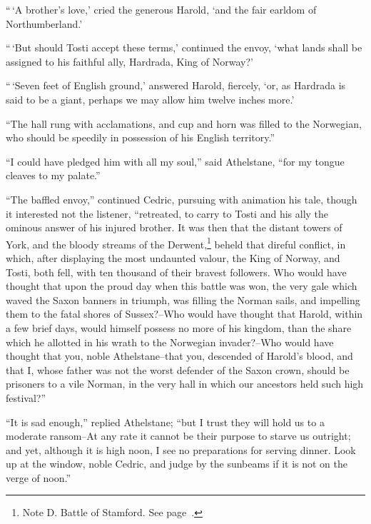 ``\,`A brother's love,' cried the generous Harold, `and the fair earldom
of Northumberland.'

``\,`But should Tosti accept these terms,' continued the envoy, `what
lands shall be assigned to his faithful ally, Hardrada, King of Norway?'

``\,`Seven feet of English ground,' answered Harold, fiercely, `or, as
Hardrada is said to be a giant, perhaps we may allow him twelve inches
more.'

``The hall rung with acclamations, and cup and horn was filled to the
Norwegian, who should be speedily in possession of his English
territory.''

``I could have pledged him with all my soul,'' said Athelstane, ``for my
tongue cleaves to my palate.''

``The baffled envoy,'' continued Cedric, pursuing with animation his
tale, though it interested not the listener, ``retreated, to carry to
Tosti and his ally the ominous answer of his injured brother. It was
then that the distant towers of York, and the bloody streams of the
Derwent,\footnote{Note D. Battle of Stamford. See page~\pageref{noteCXXI}.}
beheld that direful conflict, in which, after
displaying the most undaunted valour, the King of Norway, and Tosti,
both fell, with ten thousand of their bravest followers. Who would have
thought that upon the proud day when this battle was won, the very gale
which waved the Saxon banners in triumph, was filling the Norman sails,
and impelling them to the fatal shores of Sussex?--Who would have
thought that Harold, within a few brief days, would himself possess no
more of his kingdom, than the share which he allotted in his wrath to
the Norwegian invader?--Who would have thought that you, noble
Athelstane--that you, descended of Harold's blood, and that I, whose
father was not the worst defender of the Saxon crown, should be
prisoners to a vile Norman, in the very hall in which our ancestors held
such high festival?''

``It is sad enough,'' replied Athelstane; ``but I trust they will hold
us to a moderate ransom--At any rate it cannot be their purpose to
starve us outright; and yet, although it is high noon, I see no
preparations for serving dinner. Look up at the window, noble Cedric,
and judge by the sunbeams if it is not on the verge of noon.''

